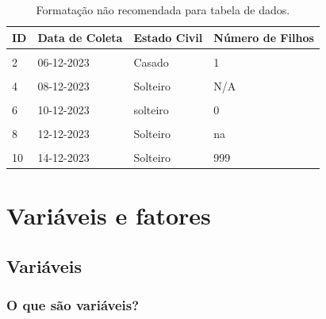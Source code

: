 \documentclass[
  a4paper,
]{book}
\begin{document}
\begin{table}

\caption{\label{tab:tabela-evite}Formatação não recomendada para tabela de dados.}
\centering
\begin{tabu} to 
\toprule
\textbf{ID} & \textbf{Data de Coleta} & \textbf{Estado Civil} & \textbf{Número de Filhos}\\
\midrule
{} &  &  & \\
2 & 06-12-2023 & Casado & 1\\
 &  &  & \\
4 & 08-12-2023 & Solteiro & N/A\\
 &  &  & \\
6 & 10-12-2023 & solteiro & 0\\
 &  &  & \\
8 & 12-12-2023 & Solteiro & na\\
 &  &  & \\
10 & 14-12-2023 & Solteiro & 999\\
\bottomrule
\end{tabu}
\end{table}

\hypertarget{variaveis-fatores}{%
\chapter{\texorpdfstring{\textbf{Variáveis e fatores}}{Variáveis e fatores}}\label{variaveis-fatores}}

\hypertarget{variaveis}{%
\section{Variáveis}\label{variaveis}}

\hypertarget{o-que-suxe3o-variuxe1veis}{%
\subsection{O que são variáveis?}\label{o-que-suxe3o-variuxe1veis}}
\end{document}
